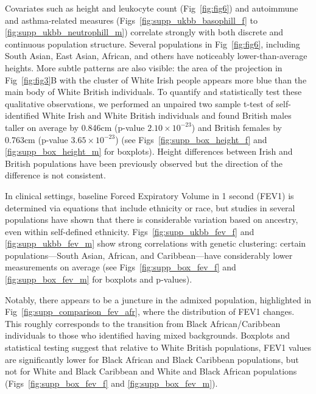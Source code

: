 Covariates such as height and leukocyte count (Fig~\ref{fig:fig6}) and autoimmune and asthma-related measures (Figs~\ref{fig:supp_ukbb_basophill_f} to \ref{fig:supp_ukbb_neutrophill_m}) correlate strongly with both discrete and continuous population structure. Several populations in Fig~\ref{fig:fig6}, including South Asian, East Asian, African, and others have noticeably lower-than-average heights. More subtle patterns are also visible: the area of the projection in Fig~\ref{fig:fig3}B with the cluster of White Irish people appears more blue than the main body of White British individuals. To quantify and statistically test these qualitative observations, we performed an unpaired two sample t-test of self-identified White Irish and White British individuals and found British males taller on average by 0.846cm (p-value $2.10\times 10^{-23}$) and British females by 0.763cm (p-value $3.65\times 10^{-23}$) (see Figs~\ref{fig:supp_box_height_f} and \ref{fig:supp_box_height_m} for boxplots). Height differences between Irish and British populations have been previously observed but the direction of the difference is not consistent\citep{robinson2015population,komlos1994stature}.

In clinical settings, baseline Forced Expiratory Volume in 1 second (FEV1) is determined via equations that include ethnicity or race\citep{quanjer2012multi}, but studies in several populations have shown that there is considerable variation based on ancestry, even within self-defined ethnicity\citep{ortega2015effect}. Figs~\ref{fig:supp_ukbb_fev_f} and \ref{fig:supp_ukbb_fev_m} show strong correlations with genetic clustering: certain populations---South Asian, African, and Caribbean---have considerably lower measurements on average (see Figs~\ref{fig:supp_box_fev_f} and \ref{fig:supp_box_fev_m} for boxplots and p-values). 
 
Notably, there appears to be a juncture in the admixed population, highlighted in Fig~\ref{fig:supp_comparison_fev_afr}, where the distribution of FEV1 changes. This roughly corresponds to the transition from Black African/Caribbean individuals to those who identified having mixed backgrounds. Boxplots and statistical testing suggest that relative to White British populations, FEV1 values are significantly lower for Black African and Black Caribbean populations, but not for White and Black Caribbean and White and Black African populations (Figs~\ref{fig:supp_box_fev_f} and \ref{fig:supp_box_fev_m}).

